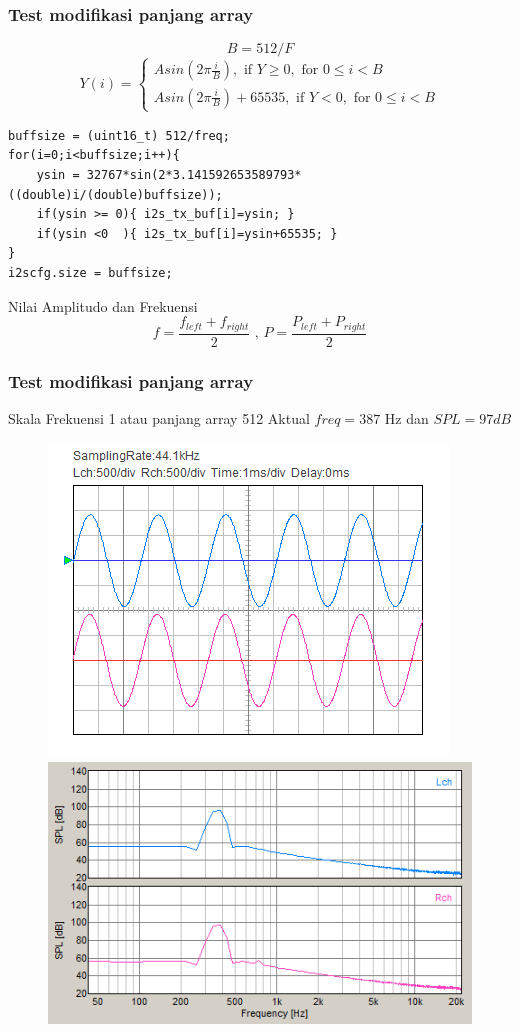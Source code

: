 \documentclass[table,dvipsnames,10pt]{beamer}
\begin{document}
	\begin{frame}[fragile]
	\frametitle{Test modifikasi panjang array}
	\begin{exampleblock}{}
		\[ B = 512/F \]
		\[
		Y(i) =
		\begin{cases}
		A sin(2 \pi \frac{i}{B}), \text{ if } Y \geq 0, \text{ for } 0 \leq i < B\\
		A sin(2 \pi \frac{i}{B})+65535, \text{ if } Y < 0, \text{ for } 0 \leq i < B
		\end{cases}
		\]
	\end{exampleblock}
	\begin{exampleblock}{}
\begin{verbatim}
buffsize = (uint16_t) 512/freq;
for(i=0;i<buffsize;i++){
	ysin = 32767*sin(2*3.141592653589793*((double)i/(double)buffsize));
	if(ysin >= 0){ i2s_tx_buf[i]=ysin; }
	if(ysin <0  ){ i2s_tx_buf[i]=ysin+65535; }
}
i2scfg.size = buffsize;
		\end{verbatim}
	\end{exampleblock}
	\begin{exampleblock}{Nilai Amplitudo dan Frekuensi }
		\[ f = \frac{f_{left} + f_{right}}{2} \text{ , } P = \frac{P_{left} + P_{right}}{2}\]
	\end{exampleblock}
	\end{frame}

	\begin{frame}[fragile]
	\frametitle{Test modifikasi panjang array}
	\begin{exampleblock}{Skala Frekuensi 1 atau panjang array 512}
		Aktual $freq = 387$ Hz dan $SPL = 97 dB$
		\begin{figure}[H]
			\centering
			\includegraphics[width=0.4\linewidth]{result/day_4/newsine400}
			\includegraphics[width=0.45\linewidth]{result/day_4/newsine400fft}
		\end{figure}
	\end{exampleblock}
	\end{frame}
\end{document}
